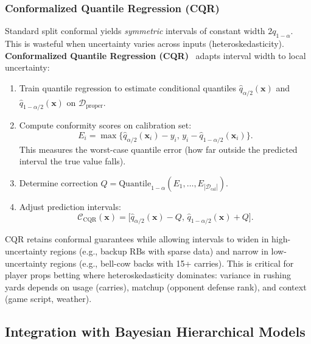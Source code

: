 \subsubsection{Conformalized Quantile Regression (CQR)}

Standard split conformal yields \textit{symmetric} intervals of constant width $2 q_{1-\alpha}$. This is wasteful when uncertainty varies across inputs (heteroskedasticity). \textbf{Conformalized Quantile Regression (CQR)}~\citep{romano2019cqr} adapts interval width to local uncertainty:

\begin{enumerate}
    \item Train quantile regression to estimate conditional quantiles $\hat{q}_{\alpha/2}(\mathbf{x})$ and $\hat{q}_{1-\alpha/2}(\mathbf{x})$ on $\mathcal{D}_{\text{proper}}$.

    \item Compute conformity scores on calibration set:
    \begin{equation}
        E_i = \max\big\{\hat{q}_{\alpha/2}(\mathbf{x}_i) - y_i, \, y_i - \hat{q}_{1-\alpha/2}(\mathbf{x}_i)\big\}.
    \end{equation}
    This measures the worst-case quantile error (how far outside the predicted interval the true value falls).

    \item Determine correction $Q = \text{Quantile}_{1-\alpha}(E_1, \ldots, E_{|\mathcal{D}_{\text{cal}}|})$.

    \item Adjust prediction intervals:
    \begin{equation}\label{eq:cqr-interval}
        \mathcal{C}_{\text{CQR}}(\mathbf{x}) = \big[\hat{q}_{\alpha/2}(\mathbf{x}) - Q, \, \hat{q}_{1-\alpha/2}(\mathbf{x}) + Q\big].
    \end{equation}
\end{enumerate}

CQR retains conformal guarantees while allowing intervals to widen in high-uncertainty regions (e.g., backup RBs with sparse data) and narrow in low-uncertainty regions (e.g., bell-cow backs with 15+ carries). This is critical for player props betting where heteroskedasticity dominates: variance in rushing yards depends on usage (carries), matchup (opponent defense rank), and context (game script, weather).

\subsection{Integration with Bayesian Hierarchical Models}\label{subsec:conformal-bnn-integration}

